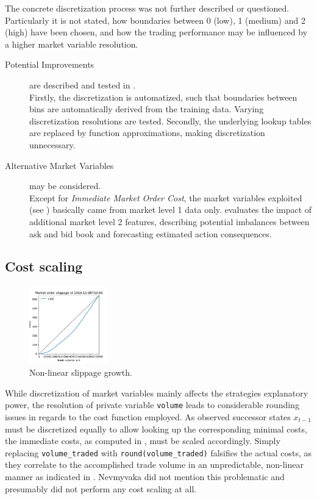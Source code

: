 The concrete discretization process was not further described or questioned. Particularly it is not stated, how boundaries between 0 (low), 1 (medium) and 2 (high) have been chosen, and how the trading performance may be influenced by a higher market variable resolution.

\begin{description}
\item[Potential Improvements] are described and tested in .\\
Firstly, the discretization is automatized, such that boundaries between bins are automatically derived from the training data. Varying discretization resolutions are tested. Secondly, the underlying lookup tables are replaced by function approximations, making discretization unnecessary.
\item[Alternative Market Variables] may be considered.\\
Except for \emph{Immediate Market Order Cost}, the market variables exploited (see ) basically came from market level 1 data only.  evaluates the impact of additional market level 2 features, describing potential imbalances between ask and bid book and forecasting estimated action consequences.
\end{description}



\subsection{Cost scaling}
\label{chap:backwardalgorithm:discussion:costscaling}
\begin{figure}
	\centering
	\includegraphics[width=0.3\textwidth,trim={0 0.2cm 0 0.7cm},clip]{content/drawings/nonlinearcosts}
	\caption{Non-linear slippage growth.}
	\label{fig:nonlinearcosts}
\end{figure}
While discretization of market variables mainly affects the strategies explanatory power, the resolution of private variable \lstinline!volume! leads to considerable rounding issues in regards to the cost function employed. As observed successor states $x_{t-1}$ must be discretized equally to allow looking up the corresponding minimal costs, the immediate costs, as computed in , must be scaled accordingly. Simply replacing \lstinline!volume_traded! with \lstinline!round(volume_traded)! falsifies the actual costs, as they correlate to the accomplished trade volume in an  unpredictable, non-linear manner as indicated in . Nevmyvaka \etal \Cite{Nevmyvaka:2006} did not mention this problematic and presumably did not perform any cost scaling at all.

